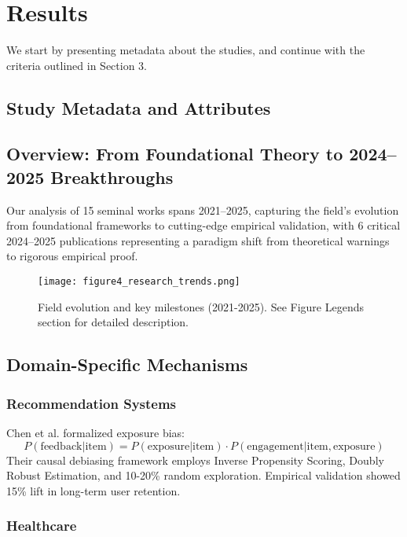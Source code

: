 \documentclass[11pt]{article}
\begin{document}
\section{Results}

We start by presenting metadata about the studies, and continue with the criteria outlined in Section 3.

\subsection{Study Metadata and Attributes}

\subsection{Overview: From Foundational Theory to 2024–2025 Breakthroughs}

Our analysis of 15 seminal works spans 2021–2025, capturing the field's evolution from foundational frameworks to cutting-edge empirical validation, with 6 critical 2024–2025 publications representing a paradigm shift from theoretical warnings to rigorous empirical proof.

\begin{figure}[H]
\centering
\texttt{[image: figure4\_research\_trends.png]}
\caption{Field evolution and key milestones (2021-2025). See Figure Legends section for detailed description.}
\label{fig:trends}
\end{figure}

\subsection{Domain-Specific Mechanisms}

\subsubsection{Recommendation Systems}

Chen et al.\cite{chen2023} formalized exposure bias: 
\begin{equation}
P(\text{feedback} | \text{item}) = P(\text{exposure} | \text{item}) \cdot P(\text{engagement} | \text{item}, \text{exposure})
\end{equation}
Their causal debiasing framework employs Inverse Propensity Scoring, Doubly Robust Estimation, and 10-20\% random exploration. Empirical validation showed 15\% lift in long-term user retention.

\subsubsection{Healthcare}
\end{document}
